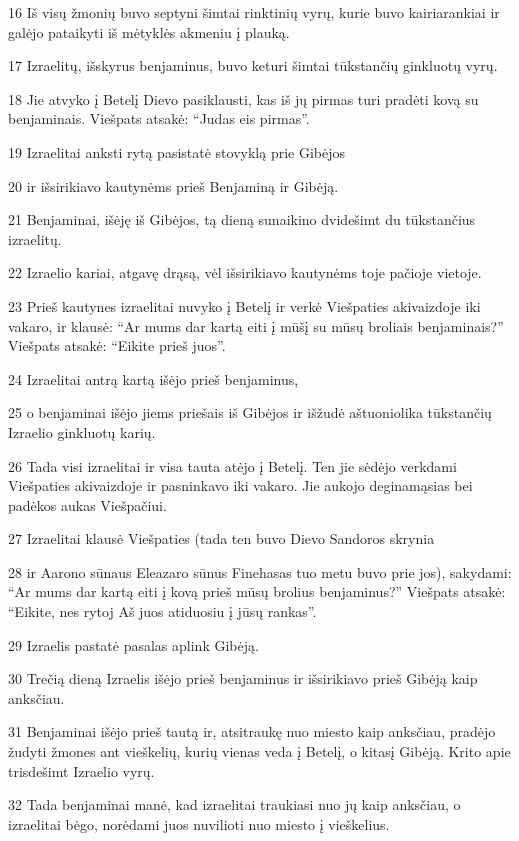 \par 16 Iš visų žmonių buvo septyni šimtai rinktinių vyrų, kurie buvo kairiarankiai ir galėjo pataikyti iš mėtyklės akmeniu į plauką. 
\par 17 Izraelitų, išskyrus benjaminus, buvo keturi šimtai tūkstančių ginkluotų vyrų. 
\par 18 Jie atvyko į Betelį Dievo pasiklausti, kas iš jų pirmas turi pradėti kovą su benjaminais. Viešpats atsakė: “Judas eis pirmas”. 
\par 19 Izraelitai anksti rytą pasistatė stovyklą prie Gibėjos 
\par 20 ir išsirikiavo kautynėms prieš Benjaminą ir Gibėją. 
\par 21 Benjaminai, išėję iš Gibėjos, tą dieną sunaikino dvidešimt du tūkstančius izraelitų. 
\par 22 Izraelio kariai, atgavę drąsą, vėl išsirikiavo kautynėms toje pačioje vietoje. 
\par 23 Prieš kautynes izraelitai nuvyko į Betelį ir verkė Viešpaties akivaizdoje iki vakaro, ir klausė: “Ar mums dar kartą eiti į mūšį su mūsų broliais benjaminais?” Viešpats atsakė: “Eikite prieš juos”. 
\par 24 Izraelitai antrą kartą išėjo prieš benjaminus, 
\par 25 o benjaminai išėjo jiems priešais iš Gibėjos ir išžudė aštuoniolika tūkstančių Izraelio ginkluotų karių. 
\par 26 Tada visi izraelitai ir visa tauta atėjo į Betelį. Ten jie sėdėjo verkdami Viešpaties akivaizdoje ir pasninkavo iki vakaro. Jie aukojo deginamąsias bei padėkos aukas Viešpačiui. 
\par 27 Izraelitai klausė Viešpaties (tada ten buvo Dievo Sandoros skrynia 
\par 28 ir Aarono sūnaus Eleazaro sūnus Finehasas tuo metu buvo prie jos), sakydami: “Ar mums dar kartą eiti į kovą prieš mūsų brolius benjaminus?” Viešpats atsakė: “Eikite, nes rytoj Aš juos atiduosiu į jūsų rankas”. 
\par 29 Izraelis pastatė pasalas aplink Gibėją. 
\par 30 Trečią dieną Izraelis išėjo prieš benjaminus ir išsirikiavo prieš Gibėją kaip anksčiau. 
\par 31 Benjaminai išėjo prieš tautą ir, atsitraukę nuo miesto kaip anksčiau, pradėjo žudyti žmones ant vieškelių, kurių vienas veda į Betelį, o kitas­į Gibėją. Krito apie trisdešimt Izraelio vyrų. 
\par 32 Tada benjaminai manė, kad izraelitai traukiasi nuo jų kaip anksčiau, o izraelitai bėgo, norėdami juos nuvilioti nuo miesto į vieškelius. 
